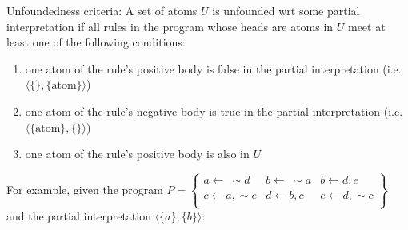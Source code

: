 \documentclass[9pt,a4paper,landscape]{article}
\begin{document}
{Unfoundedness criteria: A set of atoms $U$ is unfounded wrt some partial interpretation if all rules in the program whose heads are atoms in $U$ meet at least one of the following conditions:

\begin{enumerate}[noitemsep, label=(\roman*)]
	\item one atom of the rule's positive body is false in the partial interpretation (i.e.\  $\langle \{\}, \{\text{atom}\} \rangle$)
	\item one atom of the rule's negative body is true in the partial interpretation (i.e.\  $\langle \{\text{atom}\}, \{\} \rangle$)
	\item one atom of the rule's positive body is also in $U$
\end{enumerate}

For example, given the program $P = \left\{\begin{array}{lll}
a \leftarrow\ \sim d & b \leftarrow\ \sim a & b \leftarrow d, e\\
c \leftarrow a, \sim e & d \leftarrow b, c & e \leftarrow d, \sim c\\
\end{array}\right\}$ and the partial interpretation $\langle \{a\}, \{b\} \rangle$:

}
\end{document}
